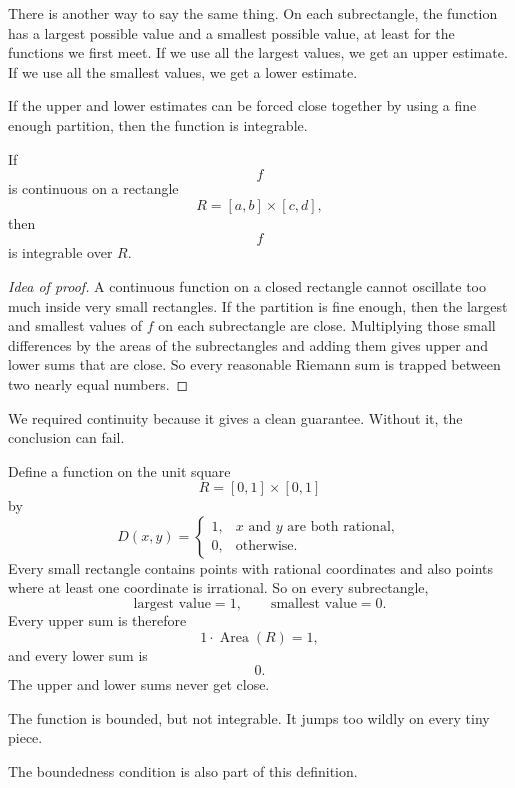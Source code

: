 There is another way to say the same thing.  On each subrectangle, the function has a
largest possible value and a smallest possible value, at least for the functions we first
meet.  If we use all the largest values, we get an upper estimate.  If we use all the
smallest values, we get a lower estimate.

If the upper and lower estimates can be forced close together by using a fine enough
partition, then the function is integrable.

\begin{theorem}
If
\[
    f
\]
is continuous on a rectangle
\[
    R=[a,b]\times[c,d],
\]
then
\[
    f
\]
is integrable over \(R\).
\end{theorem}

\begin{proof}[Idea of proof]
A continuous function on a closed rectangle cannot oscillate too much inside very
small rectangles.  If the partition is fine enough, then the largest and smallest values
of \(f\) on each subrectangle are close.  Multiplying those small differences by the
areas of the subrectangles and adding them gives upper and lower sums that are close.
So every reasonable Riemann sum is trapped between two nearly equal numbers.
\end{proof}

We required continuity because it gives a clean guarantee.  Without it, the conclusion
can fail.

\begin{example}
Define a function on the unit square
\[
    R=[0,1]\times[0,1]
\]
by
\[
    D(x,y)=
    \begin{cases}
    1, & x\text{ and }y\text{ are both rational},\\
    0, & \text{otherwise}.
    \end{cases}
\]
Every small rectangle contains points with rational coordinates and also points where
at least one coordinate is irrational.  So on every subrectangle,
\[
    \text{largest value}=1,
    \qquad
    \text{smallest value}=0.
\]
Every upper sum is therefore
\[
    1\cdot \operatorname{Area}(R)=1,
\]
and every lower sum is
\[
    0.
\]
The upper and lower sums never get close.

The function is bounded, but not integrable.  It jumps too wildly on every tiny piece.
\end{example}

The boundedness condition is also part of this definition.


